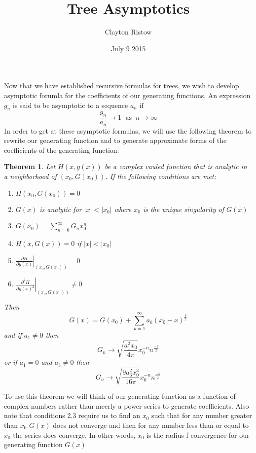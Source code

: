\documentclass{article}
\title{Tree Asymptotics}
\author{Clayton Ristow}
\date{July 9 2015}
\begin{document}
\maketitle

Now that we have established recursive formulas for trees, we wish to develop asymptotic forumla for the coefficients of our generating functions. An expression \(g_n\) is said to be asymptotic to a sequence \(a_n\) if 
\begin{equation}
\frac{g_n}{a_n} \to 1 \; \text{ as } \: n \to \infty
\end{equation}
In order to get at these asymptotic formulas, we will use the following theorem to rewrite our generating function and to generate approximate forms of the coefficients of the generating function:
\newtheorem{theorem}{Theorem}
\begin{theorem}
Let \(H(x,y(x))\) be a complex vauled function that is analytic in a neighborhood of \((x_0,G(x_0))\). If the following conditions are met:
\begin{enumerate}
\item \(H(x_0,G(x_0))=0\)
\item \(G(x)\) is analytic for \(|x|<|x_0|\) where \(x_0\) is the unique singularity of \(G(x)\)
\item \(G(x_0)=\sum_{n=0}^\infty G_nx_0^n\)
\item \(H(x,G(x))=0\) if \(|x|<|x_0|\)
\item \(\left.\frac{\partial H}{\partial {y(x)}}\right|_{(x_0,G(x_0))} = 0\)
\item \(\left.\frac{\partial^2 H}{\partial {y(x)}^2}\right|_{(x_0,G(x_0))} \neq 0\)
\end{enumerate}
Then
\[G(x)=G(x_0) + \sum_{k=1}^\infty a_k(x_0-x)^{\frac{k}{2}}\]
and if \(a_1 \neq 0\) then 
\[G_n \to \sqrt{ \frac{a_1^2x_0}{4\pi}}x_0^{-n}n^{\frac{-3}{2}}\]
or if \(a_1=0\) and \(a_3 \neq 0\) then 
\[G_n \to \sqrt{\frac{9a_3^2x_0^3}{16\pi}}x_0^{-n}n^{\frac{-5}{2}}\]
\end{theorem}

To use this theorem we will think of our generating function as a function of complex numbers rather than meerly a power series to generate coefficients. Also note that conditions 2,3  require us to find an \(x_0\) such that for any number greater than \(x_0\) \(G(x)\) does not converge and then for any number less than or equal to \(x_0\) the series does converge. In other words, \(x_0\) is the radius f convergence for our generating function \(G(x)\)
\end{document}
